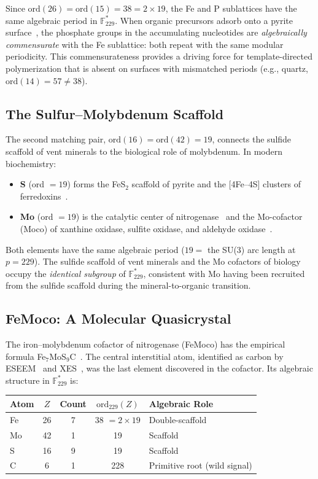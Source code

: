 \documentclass[12pt]{article}
\theoremstyle{principia}
\theoremstyle{definition}
\theoremstyle{remark}
\providecommand{\FF}{\mathbb{F}}
\begin{document}
Since $\mathrm{ord}(26) = \mathrm{ord}(15) = 38 = 2 \times 19$, the Fe and P sublattices have the same algebraic period in $\FF_{229}^*$. When organic precursors adsorb onto a pyrite surface~\cite{Wachtershauser88}, the phosphate groups in the accumulating nucleotides are \emph{algebraically commensurate} with the Fe sublattice: both repeat with the same modular periodicity. This commensurateness provides a driving force for template-directed polymerization that is absent on surfaces with mismatched periods (e.g., quartz, $\mathrm{ord}(14) = 57 \neq 38$).

\subsection{The Sulfur--Molybdenum Scaffold}

The second matching pair, $\mathrm{ord}(16) = \mathrm{ord}(42) = 19$, connects the sulfide scaffold of vent minerals to the biological role of molybdenum. In modern biochemistry:
\begin{itemize}[noitemsep]
    \item \textbf{S} (ord $= 19$) forms the FeS$_2$ scaffold of pyrite and the [4Fe--4S] clusters of ferredoxins~\cite{Beinert97}.
    \item \textbf{Mo} (ord $= 19$) is the catalytic center of nitrogenase~\cite{Burgess96} and the Mo-cofactor (Moco) of xanthine oxidase, sulfite oxidase, and aldehyde oxidase~\cite{Hille96}.
\end{itemize}
Both elements have the same algebraic period ($19 =$ the SU(3) arc length at $p = 229$). The sulfide scaffold of vent minerals and the Mo cofactors of biology occupy the \emph{identical subgroup} of $\FF_{229}^*$, consistent with Mo having been recruited from the sulfide scaffold during the mineral-to-organic transition.

\subsection{FeMoco: A Molecular Quasicrystal}\label{sec:femoco}

The iron--molybdenum cofactor of nitrogenase (FeMoco) has the empirical formula Fe$_7$MoS$_9$C~\cite{Lancaster11, Spatzal11}. The central interstitial atom, identified as carbon by ESEEM~\cite{Lancaster11} and XES~\cite{Lancaster14}, was the last element discovered in the cofactor. Its algebraic structure in $\FF_{229}^*$ is:

\begin{center}
\begin{tabular}{@{}lcccl@{}}
\toprule
\textbf{Atom} & $Z$ & \textbf{Count} & $\mathrm{ord}_{229}(Z)$ & \textbf{Algebraic Role} \\
\midrule
Fe & 26 & 7 & 38 $= 2 \times 19$ & Double-scaffold \\
Mo & 42 & 1 & 19 & Scaffold \\
S  & 16 & 9 & 19 & Scaffold \\
C  & 6  & 1 & 228 & Primitive root (wild signal) \\
\bottomrule
\end{tabular}
\end{center}
\end{document}
